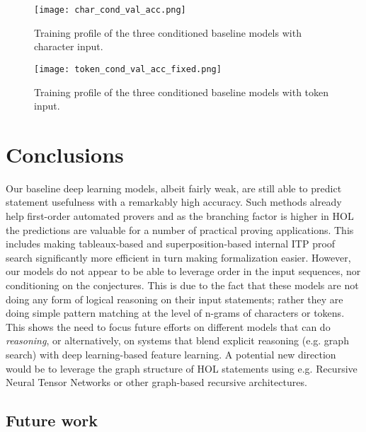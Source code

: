\documentclass[]{article}
\begin{document}
\begin{figure}[!ht]
\centering
  \parbox{.48\textwidth}{
    \hspace{.05\textwidth}\texttt{[image: char\_cond\_val\_acc.png]}
    \caption{Training profile of the three conditioned baseline models with character input.}
    \label{cond_char_fig}
  }\hspace{0.03\textwidth}
  \begin{minipage}{.48\textwidth}
    \hspace{.05\textwidth}\texttt{[image: token\_cond\_val\_acc\_fixed.png]}
    \caption{Training profile of the three conditioned baseline models with token input.}
    \label{cond_token_fig}
  \end{minipage}
\end{figure}


\section{Conclusions}\label{s:concl}

Our baseline deep learning models, albeit fairly weak, are still able to
predict statement usefulness with a remarkably high accuracy. Such methods
already help first-order automated provers \citep{femalecop} and as the branching factor
is higher in HOL the predictions are valuable for a number of practical
proving applications.
This includes making tableaux-based \citep{blast} and superposition-based \citep{metis}
internal ITP proof search significantly more efficient in turn making formalization easier.
However, our models do not appear to be able to leverage order in the
input sequences, nor 
conditioning
on the conjectures. This is due to the fact that these models are not
doing any form of logical reasoning on their input statements; rather
they are doing simple pattern matching at the level of n-grams of
characters or tokens.
This shows the need to focus future efforts on different
models that can do \emph{reasoning}, or alternatively, on systems that
blend explicit reasoning (e.g. graph search) with deep learning-based feature learning.
A potential new direction would be to leverage the graph structure of HOL statements
using e.g. Recursive Neural Tensor Networks \citep{socher2013, recursivenets}
or other graph-based recursive architectures.


\subsection{Future work}\label{future}
\end{document}
